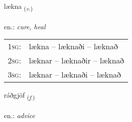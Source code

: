 \documentclass[frontgrid, backgrid]{flacards}\usepackage[]{graphicx}\usepackage[]{xcolor}
\begin{document}
\renewcommand{\blhead}{\vskip5pt {\small\bfseries\footnotesize Sagnorð | Verb }}
\renewcommand{\bcfoot}{\vskip5pt \hspace{2pt}{\small\bfseries\footnotesize 2K}}


{lækna \small{\textsubscript{(\textit{v.})}} \\[1ex] %
\textphonetic{[laihkna]} \\
en.: \emph{cure, heal} \\  [2ex]
\renewcommand*{\arraystretch}{0.8}
\begin{tabular}{p{1cm}l}
\textsc{1sg}: & lækna -- læknaði -- læknað \\ 
\textsc{2sg}: & læknar -- læknaðir -- læknað \\ 
\textsc{3sg}: & læknar -- læknaði -- læknað \\ 
\end{tabular}
}

\renewcommand{\flhead}{\vskip5pt \fboxsep=0pt {\small\bfseries\footnotesize Nafnorð | Noun}}
\renewcommand{\fcfoot}{\vskip5pt \fboxsep=0pt \hspace{2pt}{\small\bfseries\footnotesize 2K}}

\renewcommand{\blhead}{\vskip5pt {\small\bfseries\footnotesize Nafnorð | Noun }}
\renewcommand{\bcfoot}{\vskip5pt \hspace{2pt}{\small\bfseries\footnotesize 2K}}


{ráðgjöf \small{\textsubscript{(\textit{f.})}} \\[1ex] %
\textphonetic{[rauðcœv]} \\
en.: \emph{advice} \\  [2ex]
\renewcommand*{\arraystretch}{0.8}
}
\end{document}
